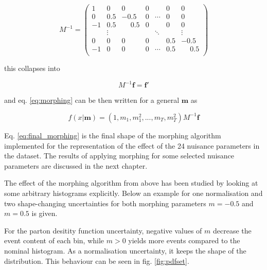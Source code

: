 \begin{equation*}
	M^{-1} = \left(\begin{matrix}
		 1 & 0   & 0   & 0 &        & 0 & 0 \\
		 0 & 0.5 &-0.5 & 0 & \cdots & 0 & 0 \\
		-1 & 0.5 &\phantom{-}0.5 & 0 &        & 0 & 0 \\
		   & \vdots &     &    & \ddots &  & \vdots \\
		 0 & 0   & 0   & 0 &        & 0.5 & -0.5 \\
		-1 & 0   & 0   & 0 & \cdots & 0.5 & \phantom{-}0.5 \\
	\end{matrix}\right)
\end{equation*}

this collapses into

\begin{equation*}
	M^{-1}\mathbf{f} = \mathbf{f}'
\end{equation*}

and eq. \ref{eq:morphing} can be then written for a general $\mathbf{m}$ as

\begin{equation}
	f(x|\mathbf{m}) = (1, m_1, m_1^2, ..., m_T, m^2_T) M^{-1}\mathbf{f}
	\label{eq:final_morphing}
\end{equation}

Eq. \ref{eq:final_morphing} is the final shape of the morphing algorithm implemented for the representation of the effect of the 24 nuisance parameters in the dataset. The results of applying morphing for some selected nuisance parameters are discussed in the next chapter.


The effect of the morphing algorithm from above has been studied by looking at some arbitrary histograms explicitly. Below an example for one normalisation and two shape-changing uncertainties for both morphing parameters $m=-0.5$ and $m = 0.5$ is given.

For the parton desitity function uncertainty, negative values of $m$ decrease the event content of each bin, while $m>0$ yields more events compared to the nominal histogram. As a normalisation uncertainty, it keeps the shape of the distribution. This behaviour can be seen in fig. \ref{fig:pdfset}.

